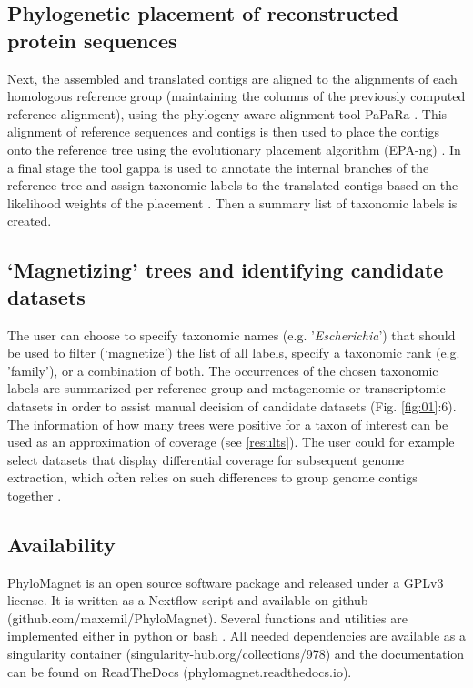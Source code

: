 \documentclass[a4paper]{article}
\begin{document}
\subsection{Phylogenetic placement of reconstructed protein sequences}
Next, the assembled and translated contigs are aligned to the alignments of each homologous reference group (maintaining the columns of the previously computed reference alignment), using the phylogeny-aware alignment tool PaPaRa \citep[Fig. \ref{fig:01}:4;][]{Berger2011a}. This alignment of reference sequences and contigs is then used to place the contigs onto the reference tree using the evolutionary placement algorithm (EPA-ng) \citep[Fig. \ref{fig:01}:5;][]{Berger2011b,Barbera2019}. In a final stage the tool gappa is used to annotate the internal branches of the reference tree and assign taxonomic labels to the translated contigs based on the likelihood weights of the placement \citep{Czech2018}. Then a summary list of taxonomic labels is created.

\subsection{‘Magnetizing’ trees and identifying candidate datasets}
The user can choose to specify taxonomic names (e.g. '\textit{Escherichia}') that should be used to filter (‘magnetize’) the list of all labels, specify a taxonomic rank (e.g. 'family'), or a combination of both. The occurrences of the chosen taxonomic labels are summarized per reference group and metagenomic or transcriptomic datasets  in order to assist manual decision of candidate datasets (Fig. \ref{fig:01}:6). The information of how many trees were positive for a taxon of interest can be used as an approximation of coverage (see \ref{results}). The user could for example select datasets that display differential coverage for subsequent genome extraction, which often relies on such differences to group genome contigs together \citep{Albertsen2013,Alneberg2014}. 

\subsection{Availability}
PhyloMagnet is an open source software package and released under a GPLv3 license. It is written as a Nextflow \citep{DiTommaso2017} script and available on github (github.com/maxemil/PhyloMagnet). Several functions and utilities are implemented either in python or bash \citep{Dalke2009,Mckinney2010,Huerta-cepas2016a}. All needed dependencies are available as a singularity \citep{Kurtzer2017} container (singularity-hub.org/collections/978) and the documentation can be found on ReadTheDocs (phylomagnet.readthedocs.io).
\end{document}
